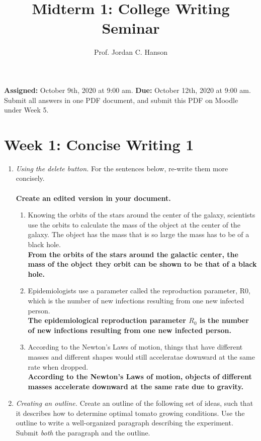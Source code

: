 \documentclass{article}
\begin{document}
\title{Midterm 1: College Writing Seminar}
\author{Prof. Jordan C. Hanson}

\maketitle

\textbf{Assigned:} October 9th, 2020 at 9:00 am.  \textbf{Due:} October 12th, 2020 at 9:00 am. Submit all answers in one PDF document, and submit this PDF on Moodle under Week 5.

\section{Week 1: Concise Writing 1}

\begin{enumerate}
\item \textit{Using the delete button.} For the sentences below, re-write them more concisely. \\ \\
\textbf{Create an edited version in your document.}
\begin{enumerate}
\item Knowing the orbits of the stars around the center of the galaxy, scientists use the orbits to calculate the mass of the object at the center of the galaxy.  The object has the mass that is so large the mass has to be of a black hole. \\
\textbf{From the orbits of the stars around the galactic center, the mass of the object they orbit can be shown to be that of a black hole.}
\item Epidemiologists use a parameter called the reproduction parameter, R0, which is the number of new infections
resulting from one new infected person. \\
\textbf{The epidemiological reproduction parameter $R_0$ is the number of new infections resulting from one new infected person.}
\item According to the Newton’s Laws of motion, things that have different masses and different shapes would still
acceleratae downward at the same rate when dropped. \\
\textbf{According to the Newton's Laws of motion, objects of different masses accelerate downward at the same rate due to gravity.}
\end{enumerate}
\item \textit{Creating an outline.} Create an outline of the following set of ideas, such that it describes how to determine optimal tomato growing conditions.  Use the outline to write a well-organized paragraph describing the experiment. Submit \textit{both} the paragraph and the outline.  \\ \\

\end{enumerate}
\end{document}
